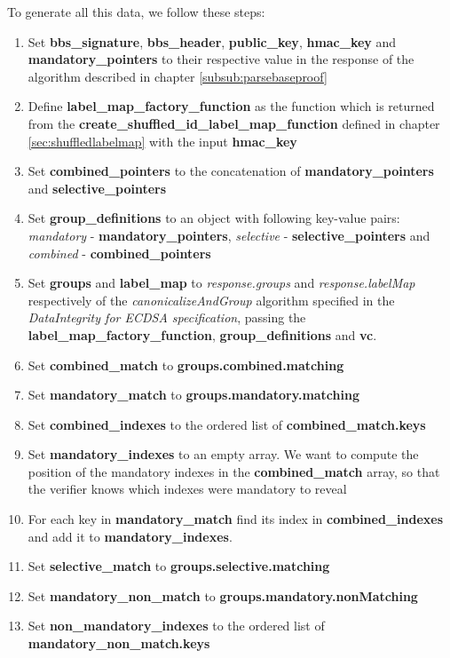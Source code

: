 \documentclass[
	a4paper               %
	,BCOR=0mm            %
	,bibliography=totoc   %
	,listof=totoc         %
	,monolingual
	,twoside=false
]{bfhthesis}              %
\begin{document}
To generate all this data, we follow these steps:
\begin{enumerate}
	\item Set \textbf{bbs\_signature}, \textbf{bbs\_header}, \textbf{public\_key}, \textbf{hmac\_key} and \textbf{mandatory\_pointers} to their respective value in the response of the algorithm described in chapter \ref{subsub:parsebaseproof}
	\item Define \textbf{label\_map\_factory\_function} as the function which is returned from the \textbf{create\_shuffled\_id\_label\_map\_function} defined in chapter \ref{sec:shuffledlabelmap} with the input \textbf{hmac\_key}
	\item Set \textbf{combined\_pointers} to the concatenation of \textbf{mandatory\_pointers} and \textbf{selective\_pointers}
	\item Set \textbf{group\_definitions} to an object with following key-value pairs: \textit{mandatory} - \textbf{mandatory\_pointers}, \textit{selective} - \textbf{selective\_pointers} and \textit{combined} - \textbf{combined\_pointers}
	\item Set \textbf{groups} and \textbf{label\_map} to \textit{response.groups} and \textit{response.labelMap} respectively of the \textit{canonicalizeAndGroup} algorithm specified in the \textit{DataIntegrity for ECDSA specification}\cite{ecdsa}, passing the \textbf{label\_map\_factory\_function}, \textbf{group\_definitions} and \textbf{vc}.
	\item Set \textbf{combined\_match} to \textbf{groups.combined.matching}
	\item Set \textbf{mandatory\_match} to \textbf{groups.mandatory.matching}
	\item Set \textbf{combined\_indexes} to the ordered list of \textbf{combined\_match.keys}
	\item Set \textbf{mandatory\_indexes} to an empty array. We want to compute the position of the mandatory indexes in the \textbf{combined\_match} array, so that the verifier knows which indexes were mandatory to reveal
	\item For each key in \textbf{mandatory\_match} find its index in \textbf{combined\_indexes} and add it to \textbf{mandatory\_indexes}.
	\item Set \textbf{selective\_match} to \textbf{groups.selective.matching}
	\item Set \textbf{mandatory\_non\_match} to \textbf{groups.mandatory.nonMatching}
	\item Set \textbf{non\_mandatory\_indexes} to the ordered list of \textbf{mandatory\_non\_match.keys}

\end{enumerate}
\end{document}
